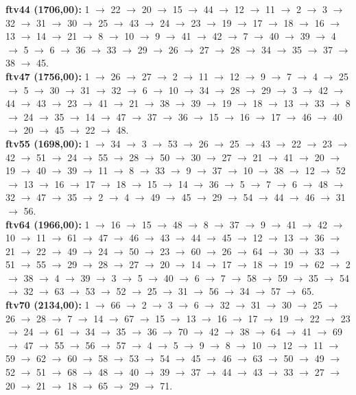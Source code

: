 \documentclass[10pt,a4paper]{article}
\begin{document}
\textbf{ftv44 (1706,00):} 1 $\to$ 22 $\to$ 20 $\to$ 15 $\to$ 44 $\to$ 12 $\to$ 11 $\to$ 2 $\to$ 3 $\to$ 32 $\to$ 31 $\to$ 30 $\to$ 25 $\to$ 43 $\to$ 24 $\to$ 23 $\to$ 19 $\to$ 17 $\to$ 18 $\to$ 16 $\to$ 13 $\to$ 14 $\to$ 21 $\to$ 8 $\to$ 10 $\to$ 9 $\to$ 41 $\to$ 42 $\to$ 7 $\to$ 40 $\to$ 39 $\to$ 4 $\to$ 5 $\to$ 6 $\to$ 36 $\to$ 33 $\to$ 29 $\to$ 26 $\to$ 27 $\to$ 28 $\to$ 34 $\to$ 35 $\to$ 37 $\to$ 38 $\to$ 45. \\
\textbf{ftv47 (1756,00):} 1 $\to$ 26 $\to$ 27 $\to$ 2 $\to$ 11 $\to$ 12 $\to$ 9 $\to$ 7 $\to$ 4 $\to$ 25 $\to$ 5 $\to$ 30 $\to$ 31 $\to$ 32 $\to$ 6 $\to$ 10 $\to$ 34 $\to$ 28 $\to$ 29 $\to$ 3 $\to$ 42 $\to$ 44 $\to$ 43 $\to$ 23 $\to$ 41 $\to$ 21 $\to$ 38 $\to$ 39 $\to$ 19 $\to$ 18 $\to$ 13 $\to$ 33 $\to$ 8 $\to$ 24 $\to$ 35 $\to$ 14 $\to$ 47 $\to$ 37 $\to$ 36 $\to$ 15 $\to$ 16 $\to$ 17 $\to$ 46 $\to$ 40 $\to$ 20 $\to$ 45 $\to$ 22 $\to$ 48. \\
\textbf{ftv55 (1698,00):} 1 $\to$ 34 $\to$ 3 $\to$ 53 $\to$ 26 $\to$ 25 $\to$ 43 $\to$ 22 $\to$ 23 $\to$ 42 $\to$ 51 $\to$ 24 $\to$ 55 $\to$ 28 $\to$ 50 $\to$ 30 $\to$ 27 $\to$ 21 $\to$ 41 $\to$ 20 $\to$ 19 $\to$ 40 $\to$ 39 $\to$ 11 $\to$ 8 $\to$ 33 $\to$ 9 $\to$ 37 $\to$ 10 $\to$ 38 $\to$ 12 $\to$ 52 $\to$ 13 $\to$ 16 $\to$ 17 $\to$ 18 $\to$ 15 $\to$ 14 $\to$ 36 $\to$ 5 $\to$ 7 $\to$ 6 $\to$ 48 $\to$ 32 $\to$ 47 $\to$ 35 $\to$ 2 $\to$ 4 $\to$ 49 $\to$ 45 $\to$ 29 $\to$ 54 $\to$ 44 $\to$ 46 $\to$ 31 $\to$ 56. \\
\textbf{ftv64 (1966,00):} 1 $\to$ 16 $\to$ 15 $\to$ 48 $\to$ 8 $\to$ 37 $\to$ 9 $\to$ 41 $\to$ 42 $\to$ 10 $\to$ 11 $\to$ 61 $\to$ 47 $\to$ 46 $\to$ 43 $\to$ 44 $\to$ 45 $\to$ 12 $\to$ 13 $\to$ 36 $\to$ 21 $\to$ 22 $\to$ 49 $\to$ 24 $\to$ 50 $\to$ 23 $\to$ 60 $\to$ 26 $\to$ 64 $\to$ 30 $\to$ 33 $\to$ 51 $\to$ 55 $\to$ 29 $\to$ 28 $\to$ 27 $\to$ 20 $\to$ 14 $\to$ 17 $\to$ 18 $\to$ 19 $\to$ 62 $\to$ 2 $\to$ 38 $\to$ 4 $\to$ 39 $\to$ 3 $\to$ 5 $\to$ 40 $\to$ 6 $\to$ 7 $\to$ 58 $\to$ 59 $\to$ 35 $\to$ 54 $\to$ 32 $\to$ 63 $\to$ 53 $\to$ 52 $\to$ 25 $\to$ 31 $\to$ 56 $\to$ 34 $\to$ 57 $\to$ 65. \\
\textbf{ftv70 (2134,00):} 1 $\to$ 66 $\to$ 2 $\to$ 3 $\to$ 6 $\to$ 32 $\to$ 31 $\to$ 30 $\to$ 25 $\to$ 26 $\to$ 28 $\to$ 7 $\to$ 14 $\to$ 67 $\to$ 15 $\to$ 13 $\to$ 16 $\to$ 17 $\to$ 19 $\to$ 22 $\to$ 23 $\to$ 24 $\to$ 61 $\to$ 34 $\to$ 35 $\to$ 36 $\to$ 70 $\to$ 42 $\to$ 38 $\to$ 64 $\to$ 41 $\to$ 69 $\to$ 47 $\to$ 55 $\to$ 56 $\to$ 57 $\to$ 4 $\to$ 5 $\to$ 9 $\to$ 8 $\to$ 10 $\to$ 12 $\to$ 11 $\to$ 59 $\to$ 62 $\to$ 60 $\to$ 58 $\to$ 53 $\to$ 54 $\to$ 45 $\to$ 46 $\to$ 63 $\to$ 50 $\to$ 49 $\to$ 52 $\to$ 51 $\to$ 68 $\to$ 48 $\to$ 40 $\to$ 39 $\to$ 37 $\to$ 44 $\to$ 43 $\to$ 33 $\to$ 27 $\to$ 20 $\to$ 21 $\to$ 18 $\to$ 65 $\to$ 29 $\to$ 71. \\
\end{document}

